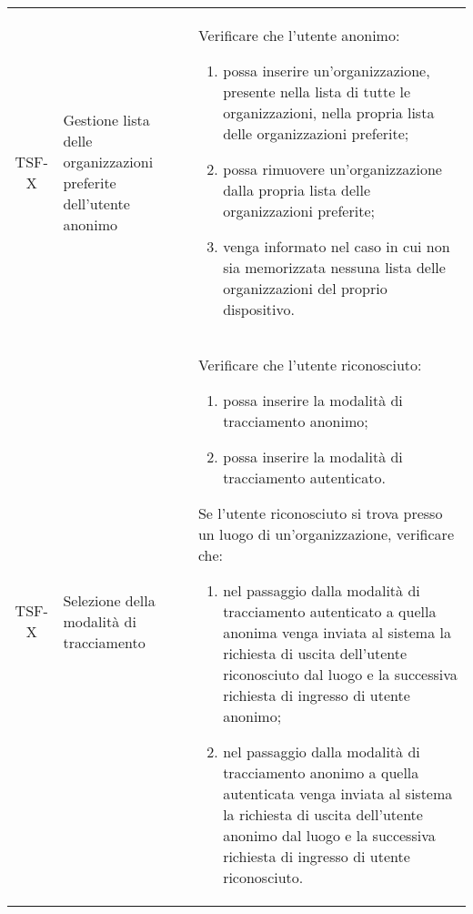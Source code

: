 {\begin{longtable}{ c | C{3cm} | C{11cm} }
TSF-X & Gestione lista delle organizzazioni preferite dell'utente anonimo &
Verificare che l'utente anonimo:
\begin{enumerate}
    \item possa inserire un'organizzazione, presente nella lista di tutte le organizzazioni, nella propria lista delle organizzazioni preferite;
    \item possa rimuovere un'organizzazione dalla propria lista delle organizzazioni preferite;
    \item venga informato nel caso in cui non sia memorizzata nessuna lista delle organizzazioni del proprio dispositivo.
\end{enumerate} \\

TSF-X & Selezione della modalità di tracciamento & 
Verificare che l'utente riconosciuto:
\begin{enumerate}
    \item possa inserire la modalità di tracciamento anonimo;
    \item possa inserire la modalità di tracciamento autenticato.
\end{enumerate}
Se l'utente riconosciuto si trova presso un luogo di un'organizzazione, verificare che:
\begin{enumerate}
    \item nel passaggio dalla modalità di tracciamento autenticato a quella anonima venga inviata al sistema la richiesta di uscita dell'utente riconosciuto dal luogo e la successiva richiesta di ingresso di utente anonimo;
    \item nel passaggio dalla modalità di tracciamento anonimo a quella autenticata venga inviata al sistema la richiesta di uscita dell'utente anonimo dal luogo e la successiva richiesta di ingresso di utente riconosciuto.
\end{enumerate} \\


\end{longtable}}
